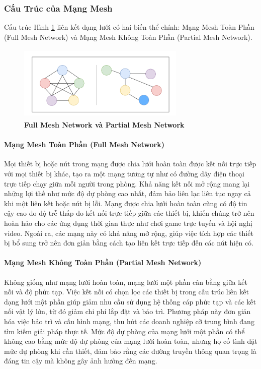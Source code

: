 \documentclass{article} %
\begin{document}
	\subsubsection{Cấu Trúc của Mạng Mesh}
	
	Cấu trúc Hình \ref{MeshStructure} liên kết dạng lưới có hai biến thể chính: Mạng Mesh Toàn Phần (Full Mesh Network) và Mạng Mesh Không Toàn Phần (Partial Mesh Network).
	\begin{figure}[!ht]
		\centering
		\includegraphics[width=8cm,height=3.6cm]{Images/MeshStructure.png}
		\caption[Full Mesh Network và Partial Mesh Network \cite{Meshtopology}]{\bfseries \fontsize{12pt}{0pt}\selectfont Full Mesh Network và Partial Mesh Network\cite{Meshtopology}}
		\label{MeshStructure}
	\end{figure}
	\paragraph{Mạng Mesh Toàn Phần (Full Mesh Network)}\mbox{}
	
	Mọi thiết bị hoặc nút trong mạng được chia lưới hoàn toàn được kết nối trực tiếp với mọi thiết bị khác, tạo ra một mạng tương tự như có đường dây điện thoại trực tiếp chạy giữa mỗi người trong phòng. Khả năng kết nối mở rộng mang lại những lợi thế như mức độ dự phòng cao nhất, đảm bảo liên lạc liên tục ngay cả khi một liên kết hoặc nút bị lỗi. Mạng được chia lưới hoàn toàn cũng có độ tin cậy cao do độ trễ thấp do kết nối trực tiếp giữa các thiết bị, khiến chúng trở nên hoàn hảo cho các ứng dụng thời gian thực như chơi game trực tuyến và hội nghị video. Ngoài ra, các mạng này có khả năng mở rộng, giúp việc tích hợp các thiết bị bổ sung trở nên đơn giản bằng cách tạo liên kết trực tiếp đến các nút hiện có. 
	
	\paragraph{Mạng Mesh Không Toàn Phần (Partial Mesh Network)}\mbox{}
	
	Không giống như mạng lưới hoàn toàn, mạng lưới một phần cân bằng giữa kết nối và độ phức tạp. Việc kết nối có chọn lọc các thiết bị trong cấu trúc liên kết dạng lưới một phần giúp giảm nhu cầu sử dụng hệ thống cáp phức tạp và các kết nối vật lý lớn, từ đó giảm chi phí lắp đặt và bảo trì. Phương pháp này đơn giản hóa việc bảo trì và cấu hình mạng, thu hút các doanh nghiệp cỡ trung bình đang tìm kiếm giải pháp thực tế. Mức độ dự phòng của mạng lưới một phần có thể không cao bằng mức độ dự phòng của mạng lưới hoàn toàn, nhưng họ cố tình đặt mức dự phòng khi cần thiết, đảm bảo rằng các đường truyền thông quan trọng là đáng tin cậy mà không gây ảnh hưởng đến mạng.
	
\end{document}
